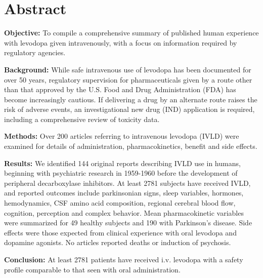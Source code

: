 \section{Abstract}
\textbf{Objective:} To compile a comprehensive summary of published human experience with levodopa given intravenously, with a focus on information required by regulatory agencies.

\textbf{Background:} While safe intravenous use of levodopa has been documented for over 50 years, regulatory supervision for pharmaceuticals given by a route other than that approved by the U.S. Food and Drug Administration (FDA) has become increasingly cautious. If delivering a drug by an alternate route raises the risk of adverse events, an investigational new drug (IND) application is required, including a comprehensive review of toxicity data.

\textbf{Methods:} Over 200 articles referring to intravenous levodopa (IVLD) were examined for details of administration, pharmacokinetics, benefit and side effects.

\textbf{Results:} We identified 144 original reports describing IVLD use in humans, beginning with psychiatric research in 1959-1960 before the development of peripheral decarboxylase inhibitors. At least 2781 subjects have received IVLD, and reported outcomes include parkinsonian signs, sleep variables, hormones, hemodynamics, CSF amino acid composition, regional cerebral blood ﬂow, cognition, perception and complex behavior. Mean pharmacokinetic variables were summarized for 49 healthy subjects and 190 with Parkinson's disease. Side effects were those expected from clinical experience with oral levodopa and dopamine agonists. No articles reported deaths or induction of psychosis.

\textbf{Conclusion:} At least 2781 patients have received i.v. levodopa with a safety profile comparable to that seen with oral administration.